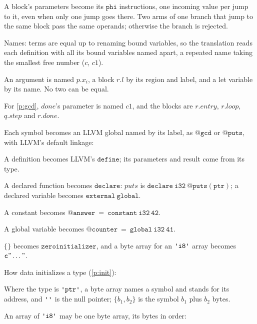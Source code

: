 \documentclass[11pt,letterpaper]{article}
\newcommand{\kw}[1]{\mathtt{#1}}
\newcommand{\str}[1]{\text{\ttfamily\textquotesingle #1\textquotesingle}}  %
\newcounter{pt}
\newcommand{\pref}[1]{\ref{#1}}  %
\begin{document}
\begin{points}
\begin{subpoints}
  \item A block's parameters become its $\kw{phi}$ instructions, one incoming value per jump to it, even
    when only one jump goes there. Two arms of one branch that jump to the same block pass the same
    operands; otherwise the branch is rejected.
  \end{subpoints}
\item\label{p:names} Names: terms are equal up to renaming bound variables, so the translation reads
  each definition with all its bound variables named apart, a repeated name taking the smallest free
  number ($c$, $c1$).
  \begin{subpoints}
  \item An argument is named $p.x_i$, a block $r.l$ by its region and label, and a let variable by its name.
    No two can be equal.
  \item For \pref{p:gcd}, $\mathit{done}$'s parameter is named $c1$, and the blocks are $r.\mathit{entry}$,
    $r.\mathit{loop}$, $q.\mathit{step}$ and $r.\mathit{done}$.
  \end{subpoints}
\item\label{p:symbols-llvm} Each symbol becomes an LLVM global named by its label, as
  $\kw{@gcd}$ or $\kw{@puts}$, with LLVM's default linkage:
  \begin{subpoints}
  \item A definition becomes LLVM's $\kw{define}$; its parameters and result come from its type.
  \item A declared function becomes $\kw{declare}$: $\mathit{puts}$ is
    $\kw{declare\ i32\ @puts(ptr)}$; a declared variable becomes $\kw{external\ global}$.
  \item A constant becomes $\kw{@answer\ =\ constant\ i32\ 42}$.
  \item A global variable becomes $\kw{@counter\ =\ global\ i32\ 41}$.
  \item $\{\}$ becomes $\kw{zeroinitializer}$, and a byte array for an $\str{i8}$ array becomes $\kw{c"\dots"}$.
  \end{subpoints}
\item\label{p:init-llvm} How data initializes a type (\pref{p:init}):
  \begin{subpoints}
  \item Where the type is $\str{ptr}$, a byte array names a symbol and stands for its address, and
    $\str{}$ is the null pointer; $\{b_1, b_2\}$ is the symbol $b_1$ plus $b_2$ bytes.
  \item An array of $\str{i8}$ may be one byte array, its bytes in order:

\end{subpoints}
\end{points}
\end{document}
